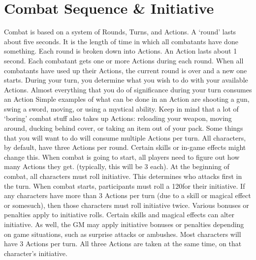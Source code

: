 \documentclass[twoside]{book}
\begin{document}
\section{Combat Sequence \& Initiative}
     Combat is based on a system of Rounds, Turns, and
             Actions. A `round' lasts about five seconds. It
             is the length of time in which all combatants have done
             something. Each round is broken down into Actions. An Action
             lasts about 1 second. Each combatant gets one or more
             Actions during each round. When all combatants have used up
             their Actions, the current round is over and a new one
             starts.  During your turn, you determine what you wish to do
             with your available Actions. Almost everything that you do
             of significance during your turn consumes an Action Simple
             examples of what can be done in an Action are shooting a
             gun, swing a sword, moving, or using a mystical ability.
             Keep in mind that a lot of `boring' combat stuff
             also takes up Actions: reloading your weapon, moving around,
             ducking behind cover, or taking an item out of your pack.
             Some things that you will want to do will consume multiple
             Actions per turn.  All characters, by default, have three Actions per
             round. Certain skills or in-game effects might change this.
             When combat is going to start, all players need to figure
             out how many Actions they get. (typically, this will be 3
             each).  At the beginning of combat, all characters must roll
             initiative. This determines who attacks first in the turn.
             When combat starts, participants must roll a 120for their
             initiative. If any characters have more than 3 Actions per
             turn (due to a skill or magical effect or somesuch), then
             those characters must roll initiative twice.  Various bonuses or penalties apply to initiative
             rolls. Certain skills and magical effects can alter
             initiative. As well, the GM may apply initiative bonuses or
             penalties depending on game situations, such as surprise
             attacks or ambushes.  Most characters will have 3 Actions per turn. All
             three Actions are taken at the same time, on that
             character's initiative. 
\end{document}
